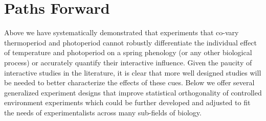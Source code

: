 \documentclass[11pt]{article}
\begin{document}
\section*{Paths Forward}
Above we have systematically demonstrated that experiments that co-vary thermoperiod and photoperiod cannot robustly differentiate the individual effect of temperature and photoperiod on a spring phenology (or any other biological process) or accurately quantify their interactive influence. Given the paucity of interactive studies in the literature, it is clear that more well designed studies will be needed to better characterize the effects of these cues. Below we offer several generalized experiment designs that improve statistical orthogonality of controlled environment experiments which could be further developed and adjusted to fit the needs of experimentalists across many sub-fields of biology.
\end{document}
